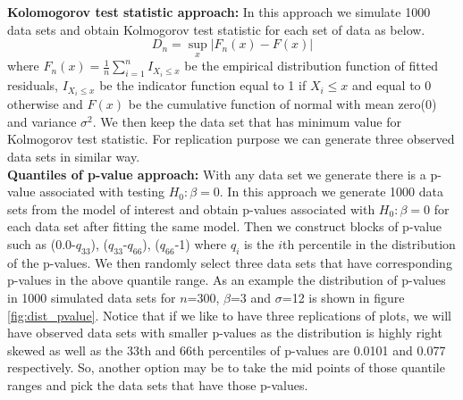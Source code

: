 \documentclass[11pt]{article}
\begin{document}
{\bf Kolomogorov test statistic approach:} In this approach we simulate 1000 data sets and obtain Kolmogorov test statistic for each set of data as below. $$D_n=\sup_x |F_n(x)-F(x)|$$ where $F_n(x)=\frac1n \sum_{i=1}^n I_{X_i\le x}$ be the empirical distribution function of fitted residuals, $I_{X_i\le x}$ be the indicator function equal to 1 if $X_i\le x$ and equal to 0 otherwise and $F(x)$ be the cumulative function of normal with mean zero(0) and variance $\sigma^2$. We then keep the data set that has minimum value for Kolmogorov test statistic.  For replication purpose we can generate three observed data sets in similar way.\\

{\bf Quantiles of p-value approach:} With any data set we generate there is a p-value associated with testing $H_0: \beta=0$. In this approach we generate 1000 data sets from the model of interest and obtain p-values associated with $H_0: \beta=0$ for each data set after fitting the same model. Then we construct blocks of p-value such as (0.0-$q_{33}$), ($q_{33}$-$q_{66}$), ($q_{66}$-1) where $q_i$ is the $i$th percentile in the distribution of the p-values. We then randomly select three data sets that have corresponding p-values in the above quantile range. As an example the distribution  of p-values in 1000 simulated data sets for $n$=300, $\beta$=3 and $\sigma$=12 is shown in figure \ref{fig:dist_pvalue}.  Notice that if we like to have three replications of plots, we will have observed data sets with smaller p-values as the distribution is highly right skewed as well as the 33th and 66th percentiles of p-values are 0.0101 and 0.077 respectively. So, another option may be to take the mid points of those quantile ranges and pick the data sets that have those p-values.\\
\end{document}
